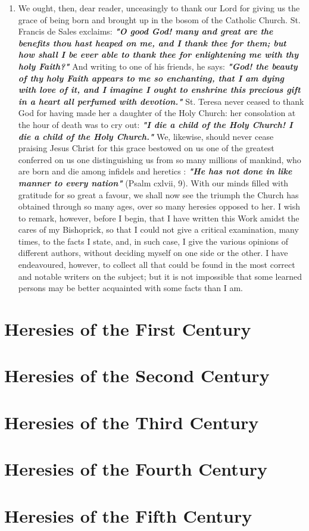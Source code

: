\documentclass[12pt]{book}
\begin{document}
\begin{enumerate}
\item We ought, then, dear reader, unceasingly to thank our Lord for giving us the grace of being born and
brought up in the bosom of the Catholic Church. St. Francis de Sales exclaims: \textit{\textbf{ "O good God! many and
great are the benefits thou hast heaped on me, and I thank thee for them; but how shall I be ever able to
thank thee for enlightening me with thy holy Faith?"}} And writing to one of his friends, he says: \textit{\textbf{
"God! the beauty of thy holy Faith appears to me so enchanting, that I am dying with love of it, and I imagine I
ought to enshrine this precious gift in a heart all perfumed with devotion."}} St. Teresa never ceased to
thank God for having made her a daughter of the Holy Church: her consolation at the hour of death was
to cry out: \textit{\textbf{"I die a child of the Holy Church! I die a child of the Holy Church."}} We, likewise, should
never cease praising Jesus Christ for this grace bestowed on us one of the greatest conferred on us one
distinguishing us from so many millions of mankind, who are born and die among infidels and heretics :
\textit{\textbf{"He has not done in like manner to every nation"}} (Psalm cxlvii, 9). With our minds filled with gratitude
for so great a favour, we shall now see the triumph the Church has obtained through so many ages, over
so many heresies opposed to her. I wish to remark, however, before I begin, that I have written this Work
amidst the cares of my Bishoprick, so that I could not give a critical examination, many times, to the facts
I state, and, in such case, I give the various opinions of different authors, without deciding myself on one
side or the other. I have endeavoured, however, to collect all that could be found in the most correct and
notable writers on the subject; but it is not impossible that some learned persons may be better
acquainted with some facts than I am.
\end{enumerate}

\chapter{Heresies of the First Century}
\chapter{Heresies of the Second Century}
\chapter{Heresies of the Third Century}
\chapter{Heresies of the Fourth Century}
\chapter{Heresies of the Fifth Century}
\end{document}
